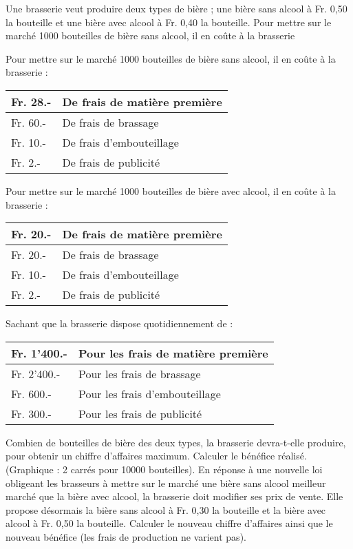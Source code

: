 \begin{exercice}
Une brasserie veut produire deux types de bière ; une bière sans alcool à Fr. 0,50 la bouteille et une bière avec alcool à Fr. 0,40 la bouteille. Pour mettre sur le marché 1000 bouteilles de bière sans alcool, il en coûte à la brasserie

Pour mettre sur le marché 1000 bouteilles de bière sans alcool, il en coûte à la brasserie :

\begin{tabular}{|l|l|}
\hline
Fr. 28.- & De frais de matière première \\ \hline
Fr. 60.- & De frais de brassage         \\ \hline
Fr. 10.- & De frais d'embouteillage     \\ \hline
Fr. 2.-  & De frais de publicité        \\ \hline
\end{tabular}


Pour mettre sur le marché 1000 bouteilles de bière avec alcool, il en coûte à la brasserie :

\begin{tabular}{|l|l|}
\hline
Fr. 20.- & De frais de matière première \\ \hline
Fr. 20.- & De frais de brassage         \\ \hline
Fr. 10.- & De frais d'embouteillage     \\ \hline
Fr. 2.-  & De frais de publicité        \\ \hline
\end{tabular}

Sachant que la brasserie dispose quotidiennement de :

\begin{tabular}{|l|l|}
\hline
Fr. 1'400.- & Pour les frais de matière première \\ \hline
Fr. 2'400.- & Pour les frais de brassage         \\ \hline
Fr. 600.-   & Pour les frais d'embouteillage     \\ \hline
Fr. 300.-   & Pour les frais de publicité        \\ \hline
\end{tabular}

Combien de bouteilles de bière des deux types, la brasserie devra-t-elle produire, pour obtenir un chiffre d’affaires maximum. Calculer le bénéfice réalisé. 
(Graphique : 2 carrés pour 10000 bouteilles). 
En réponse à une nouvelle loi obligeant les brasseurs à mettre sur le marché une bière sans alcool meilleur marché que la bière avec alcool, la brasserie doit modifier ses prix de vente. Elle propose désormais la bière sans alcool à Fr. 0,30 la bouteille et la bière avec alcool à Fr. 0,50 la bouteille. Calculer le nouveau chiffre d’affaires ainsi que le nouveau bénéfice (les frais de production ne varient pas). 
\end{exercice}

